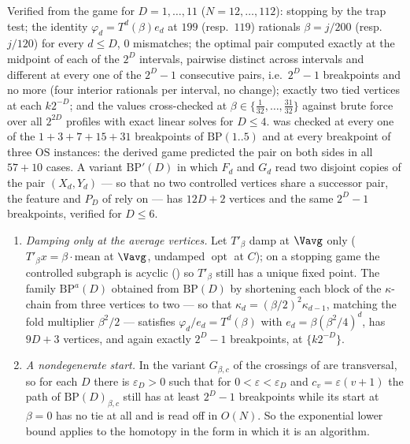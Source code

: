 \begin{remark}\label{pp:tent-measured}
Verified from the game for $D=1,\dots,11$ ($N=12,\dots,112$): stopping by the
trap test; the identity $\varphi_d=T^{d}(\beta)e_d$ at $199$ (resp.\ $119$)
rationals $\beta=j/200$ (resp.\ $j/120$) for every $d\le D$, $0$ mismatches; the
optimal pair computed exactly at the midpoint of each of the $2^{D}$ intervals,
pairwise distinct across intervals and different at every one of the $2^{D}-1$
consecutive pairs, i.e.\ $2^{D}-1$ breakpoints and no more (four interior
rationals per interval, no change); exactly two tied vertices at each $k2^{-D}$;
and the values cross-checked at $\beta\in\{\tfrac1{32},\dots,\tfrac{31}{32}\}$
against brute force over all $2^{2D}$ profiles with exact linear solves for
$D\le4$.  was checked at every one of the $1+3+7+15+31$
breakpoints of $\mathrm{BP}(1..5)$ and at every breakpoint of three $\mathrm{OS}$
instances: the derived game predicted the pair on both sides in all $57+10$
cases. A variant $\mathrm{BP}'(D)$ in which $F_d$ and $G_d$ read two disjoint
copies of the pair $(X_d,Y_d)$ --- so that no two controlled vertices share a
successor pair, the feature  and $P_D$ of
 rely on --- has $12D+2$ vertices and the same $2^{D}-1$
breakpoints, verified for $D\le6$.
\end{remark}


\begin{proposition}\label{pp:robust}
\begin{enumerate}[label=(\alph*),leftmargin=2.2em]
\item \emph{Damping only at the average vertices.} Let $T'_\beta$ damp at
  $\Vavg$ only ($T'_\beta x=\beta\cdot\text{mean}$ at $\Vavg$, undamped
  $\operatorname{opt}$ at $C$); on a stopping game the controlled subgraph is
  acyclic () so $T'_\beta$ still has a unique fixed point.
  The family $\mathrm{BP}^{a}(D)$ obtained from $\mathrm{BP}(D)$ by shortening
  each block of the $\kappa$-chain from three vertices to two --- so that
  $\kappa_d=(\beta/2)^{2}\kappa_{d-1}$, matching the fold multiplier
  $\beta^{2}/2$ --- satisfies $\varphi_d/e_d=T^{d}(\beta)$ with
  $e_d=\beta(\beta^{2}/4)^{d}$, has $9D+3$ vertices, and again exactly
  $2^{D}-1$ breakpoints, at $\{k2^{-D}\}$.
\item \emph{A nondegenerate start.} In the variant $G_{\beta,c}$ of
   the crossings of  are transversal, so for each
  $D$ there is $\varepsilon_D>0$ such that for $0<\varepsilon<\varepsilon_D$ and
  $c_v=\varepsilon(v+1)$ the path of $\mathrm{BP}(D)_{\beta,c}$ still has at
  least $2^{D}-1$ breakpoints while its start at $\beta=0$ has no tie at all and
  is read off in $O(N)$. So the exponential lower bound applies to the homotopy
  in the form in which it is an algorithm.
\end{enumerate}
\end{proposition}

